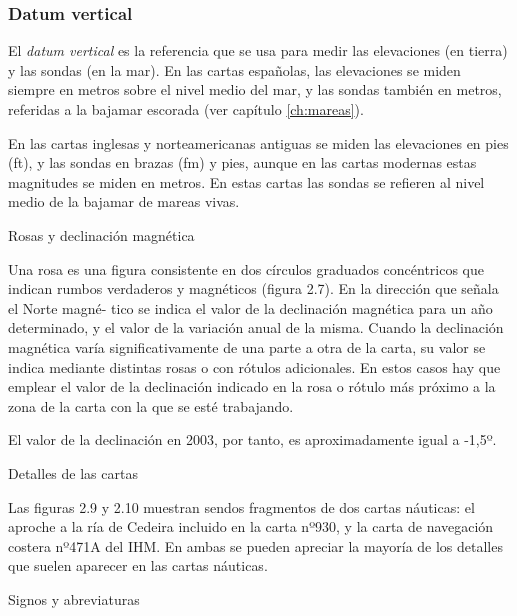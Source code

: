 \subsubsection{Datum vertical }


El \emph{datum vertical} es la referencia que se usa para medir las elevaciones (en tierra) y las 
sondas (en la mar). En las cartas españolas, las elevaciones se miden siempre en metros 
sobre el nivel medio del mar, y las sondas también en metros, referidas a la bajamar escorada (ver capítulo \ref{ch:mareas}). 

En las cartas inglesas y norteamericanas antiguas se miden las elevaciones en pies (ft), 
y las sondas en brazas (fm) y pies, aunque en las cartas modernas estas magnitudes se 
miden en metros. En estas cartas las sondas se refieren al nivel medio de la bajamar de 
mareas vivas. 

Rosas y declinación magnética 

Una rosa es una figura consistente en dos círculos graduados concéntricos que indican 
rumbos verdaderos y magnéticos (figura 2.7). En la dirección que señala el Norte magné- 
tico se indica el valor de la declinación magnética para un año determinado, y el valor de 
la variación anual de la misma. 
Cuando la declinación magnética varía significativamente de una parte a otra de la 
carta, su valor se indica mediante distintas rosas o con rótulos adicionales. En estos casos 
hay que emplear el valor de la declinación indicado en la rosa o rótulo más próximo a la 
zona de la carta con la que se esté trabajando. 

El valor de la declinación en 2003, por tanto, es aproximadamente igual a -1,5º. 

Detalles de las cartas 

Las figuras 2.9 y 2.10 muestran sendos fragmentos de dos cartas náuticas: el aproche a la 
ría de Cedeira incluido en la carta nº930, y la carta de navegación costera nº471A del 
IHM. En ambas se pueden apreciar la mayoría de los detalles que suelen aparecer en las 
cartas náuticas. 

Signos y abreviaturas 

